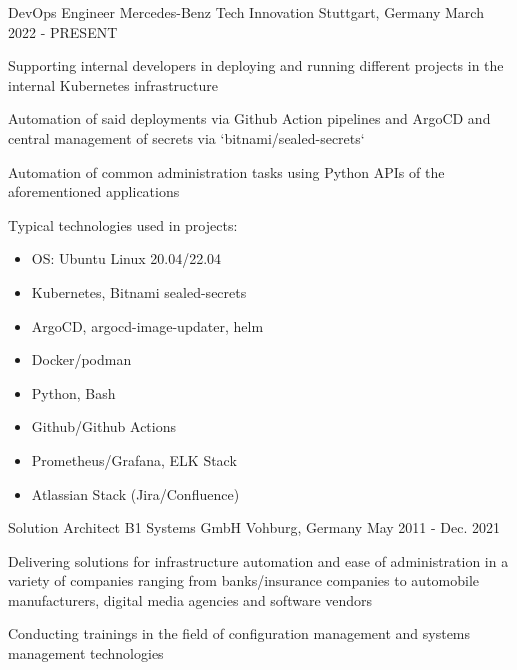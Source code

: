 \begin{cventries}

  \cventry
    {DevOps Engineer} %
    {Mercedes-Benz Tech Innovation} %
    {Stuttgart, Germany} %
    {March 2022 - PRESENT} %
    {
      \begin{cvitems} %
        \item Supporting internal developers in deploying and running different projects in the
          internal Kubernetes infrastructure
        \item Automation of said deployments via Github Action pipelines and ArgoCD and central
          management of secrets via `bitnami/sealed-secrets`
        \item Automation of common administration tasks using Python APIs of the aforementioned
          applications
        \item Typical technologies used in projects:
          \begin{itemize}
            \item OS: Ubuntu Linux 20.04/22.04
            \item Kubernetes, Bitnami sealed-secrets
            \item ArgoCD, argocd-image-updater, helm
            \item Docker/podman
            \item Python, Bash
            \item Github/Github Actions
            \item Prometheus/Grafana, ELK Stack
            \item Atlassian Stack (Jira/Confluence)
          \end{itemize}
      \end{cvitems}
    }
  \cventry
    {Solution Architect} %
    {B1 Systems GmbH} %
    {Vohburg, Germany} %
    {May 2011 - Dec. 2021} %
    {
      \begin{cvitems} %
        \item Delivering solutions for infrastructure automation and ease of administration in a variety of companies ranging from banks/insurance companies to automobile manufacturers, digital media agencies and software vendors
        \item Conducting trainings in the field of configuration management and systems management technologies

\end{cvitems}}
\end{cventries}

